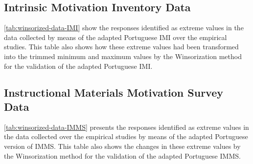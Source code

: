\subsection{Intrinsic Motivation Inventory Data}

\autoref{tab:winsorized-data-IMI} show the responses identified as extreme values in the data collected by means of the adapted Portuguese IMI over the empirical studies. This table also shows how these extreme values had been transformed into the trimmed minimum and maximum values by the Winsorization method for the validation of the adapted Portuguese IMI.

\subsection{Instructional Materials Motivation Survey Data}

\autoref{tab:winsorized-data-IMMS} presents the responses identified as extreme values in the data collected over the empirical studies by means of the adapted Portuguese version of IMMS. This table also shows the changes in these extreme values by the Winsorization method for the validation of the adapted Portuguese IMMS.

